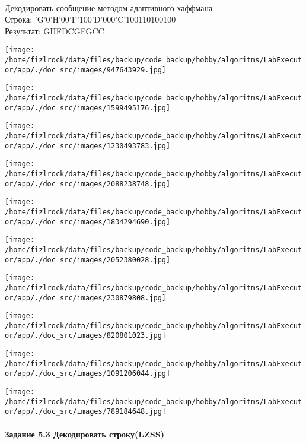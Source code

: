 \documentclass[a4paper, 12pt]{article}
\begin{document}
\\ 

Декодировать сообщение методом адаптивного хаффмана \\
Строка: 
'G'0'H'00'F'100'D'000'C'100110100100\\
Результат: GHFDCGFGCC

\texttt{[image: /home/fizlrock/data/files/backup/code\_backup/hobby/algoritms/LabExecutor/app/./doc\_src/images/947643929.jpg]}

\texttt{[image: /home/fizlrock/data/files/backup/code\_backup/hobby/algoritms/LabExecutor/app/./doc\_src/images/1599495176.jpg]}

\texttt{[image: /home/fizlrock/data/files/backup/code\_backup/hobby/algoritms/LabExecutor/app/./doc\_src/images/1230493783.jpg]}

\texttt{[image: /home/fizlrock/data/files/backup/code\_backup/hobby/algoritms/LabExecutor/app/./doc\_src/images/2088238748.jpg]}

\texttt{[image: /home/fizlrock/data/files/backup/code\_backup/hobby/algoritms/LabExecutor/app/./doc\_src/images/1834294690.jpg]}

\texttt{[image: /home/fizlrock/data/files/backup/code\_backup/hobby/algoritms/LabExecutor/app/./doc\_src/images/2052380028.jpg]}

\texttt{[image: /home/fizlrock/data/files/backup/code\_backup/hobby/algoritms/LabExecutor/app/./doc\_src/images/230879808.jpg]}

\texttt{[image: /home/fizlrock/data/files/backup/code\_backup/hobby/algoritms/LabExecutor/app/./doc\_src/images/820801023.jpg]}

\texttt{[image: /home/fizlrock/data/files/backup/code\_backup/hobby/algoritms/LabExecutor/app/./doc\_src/images/1091206044.jpg]}

\texttt{[image: /home/fizlrock/data/files/backup/code\_backup/hobby/algoritms/LabExecutor/app/./doc\_src/images/789184648.jpg]}
\pagebreak
\paragraph{Задание 5.3 Декодировать строку(LZSS)\\}
\end{document}
